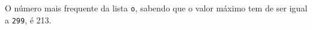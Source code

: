 \documentclass[12pt,varwidth=16cm,border=1pt]{standalone}
\begin{document}
O número mais frequente da lista \verb+o+, sabendo que o valor máximo tem de ser igual a \verb+299+, é 213.

\questiomfalse
\end{document}
